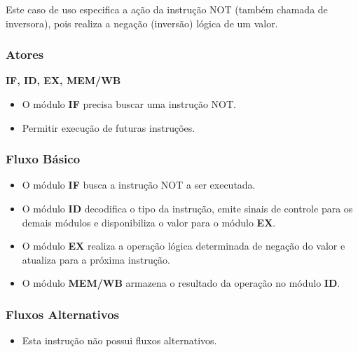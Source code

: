 
Este caso de uso especifica a ação da instrução NOT (também chamada de inversora), pois realiza a negação (inversão) lógica de um valor.
 
\subsubsection*{Atores}
\textbf{IF, ID, EX, MEM/WB}

\preconditions 
\begin{itemize}
 \item O módulo \textbf{IF} precisa buscar uma instrução NOT.
\end{itemize}

\postconditions
\begin{itemize}	
  \item Permitir execução de futuras instruções.
\end{itemize}

\subsubsection*{Fluxo Básico}
\begin{itemize}
\item O módulo \textbf{IF} busca a instrução NOT a ser executada.
\item O módulo \textbf{ID} decodifica o tipo da instrução, emite sinais de controle para os demais módulos e disponibiliza o valor para o módulo \textbf{EX}.
\item O módulo \textbf{EX} realiza a operação lógica determinada de negação do valor e atualiza para a próxima instrução.
\item O módulo \textbf{MEM/WB} armazena o resultado da operação no módulo \textbf{ID}.
\end{itemize}

\subsubsection*{Fluxos Alternativos}
\begin{itemize}
\item Esta instrução não possui fluxos alternativos.
\end{itemize}

%		


